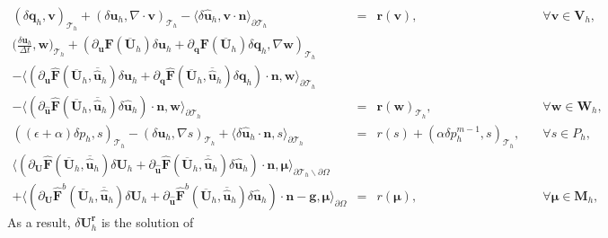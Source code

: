 \documentclass[11pt]{article}
\begin{document}
\begin{equation}
\begin{array}{rcll}
(\delta \bm{q}_h, \bm{v})_{\mathcal{T}_h} + (\delta \bm{u}_h, \nabla \cdot \bm{v})_{\mathcal{T}_h} - \langle \delta \widehat{\bm{u}}_h, \bm{v} \cdot \bm{n} \rangle_{\partial \mathcal{T}_h}  & = & \bm{r}(\bm{v}), & \quad \forall \bm{v} \in \bm{V}_h, \\[2ex] 
\displaystyle \Big(\frac{\delta \bm{u}_h}{\Delta t}, \bm{w} \Big)_{\mathcal{T}_h} + (\partial_{\bm{u}} \bm{F} (\overline{\bm{U}}_h) \delta \bm{u}_h + \partial_{\bm{q}} \bm{F} (\overline{\bm{U}}_h) \delta \bm{q}_h, \nabla \bm{w})_{\mathcal{T}_h} & & \\[2ex]
- \langle (\partial_{\bm{u}} \widehat{\bm{F}} (\overline{\bm{U}}_h,\overline{\widehat{\bm{u}}}_h) \delta \bm{u}_h + \partial_{{\bm{q}}} \widehat{\bm{F}} (\overline{\bm{U}}_h,\overline{\widehat{\bm{u}}}_h) \delta {\bm{q}}_h) \cdot \bm{n}, \bm{w} \rangle_{\partial \mathcal{T}_h} & & \\[2ex]
 - \langle (\partial_{\widehat{\bm{u}}} \widehat{\bm{F}} (\overline{\bm{U}}_h,  \overline{\widehat{\bm{u}}}_h) \delta \widehat{\bm{u}}_h) \cdot \bm{n}, \bm{w} \rangle_{\partial \mathcal{T}_h}   & = &  \bm{r}(\bm{w})_{\mathcal{T}_h},  & \quad \forall \bm{w} \in \bm{W}_h, \\[2ex]
 ((\epsilon + \alpha) \delta p_h, s)_{\mathcal{T}_h} - (\delta \bm{u}_h, \nabla s)_{\mathcal{T}_h} + \langle \delta \widehat{\bm{u}}_h \cdot \bm{n},s \rangle_{\partial \mathcal{T}_h}  & = & r(s) +  (\alpha \delta p_h^{m-1}, s)_{\mathcal{T}_h}, & \quad \forall s \in P_h, \\[2ex]
 \langle (\partial_{\bm{U}} \widehat{\bm{F}} (\overline{\bm{U}}_h, \overline{\widehat{\bm{u}}}_h) \delta\bm{U}_h + \partial_{\widehat{\bm{u}}} \widehat{\bm{F}} (\overline{\bm{U}}_h, \overline{\widehat{\bm{u}}}_h) \delta \widehat{\bm{u}}_h ) \cdot \bm{n}, \bm{\mu} \rangle_{\partial \mathcal{T}_h \backslash \partial \Omega} & & \\[2ex]
  + \langle (\partial_{\bm{U}} \widehat{\bm{F}}^b (\overline{\bm{U}}_h, \overline{\widehat{\bm{u}}}_h) \delta\bm{U}_h + \partial_{\widehat{\bm{u}}} \widehat{\bm{F}}^b (\overline{\bm{U}}_h, \overline{\widehat{\bm{u}}}_h) \delta \widehat{\bm{u}}_h ) \cdot \bm{n}  - \bm{g}, \bm{\mu} \rangle_{\partial \Omega}  & = & r(\bm{\mu}), & \quad \forall \bm{\mu} \in \bm{M}_h ,
\end{array}
\end{equation}
As a result, $\delta \bm{U}_h^{\bm{r}}$ is the solution of
\end{document}
